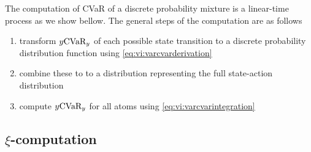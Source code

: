 The computation of CVaR of a discrete probability mixture is a linear-time process as we show bellow. The general steps of the computation are as follows

\begin{enumerate}
\item transform $y \text{CVaR}_y$ of each possible state transition to a discrete probability distribution function using \ref{eq:vi:varcvarderivation}
\item combine these to to a distribution representing the full state-action distribution
\item compute $y \text{CVaR}_y$ for all atoms using \ref{eq:vi:varcvarintegration}
\end{enumerate}




%
%
%
%


\subsection{$\xi$-computation}

